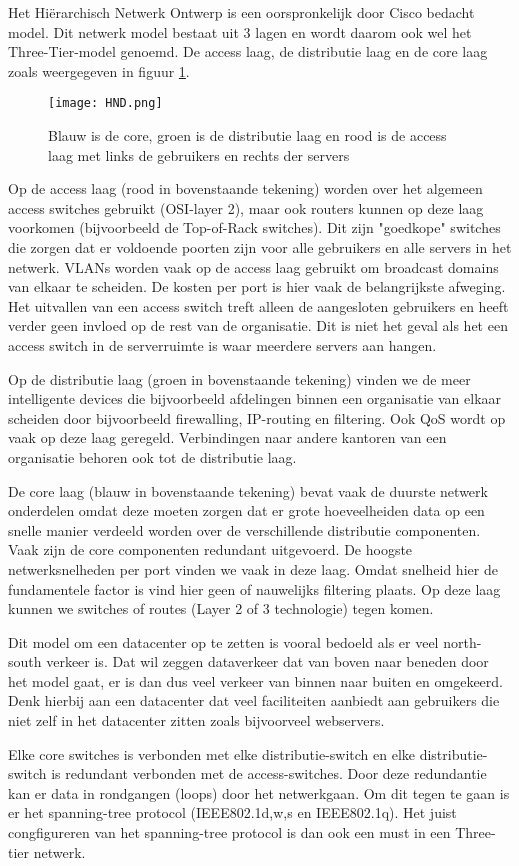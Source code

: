 Het Hi\"erarchisch Netwerk Ontwerp is een oorspronkelijk door Cisco bedacht model. Dit netwerk model bestaat uit 3 lagen en wordt daarom ook wel het Three-Tier-model genoemd. De access laag, de distributie laag en de core laag zoals weergegeven in figuur \ref{HND}.

\begin{figure}[H]
\centering
\texttt{[image: HND.png]}
\caption{Blauw is de core, groen is de distributie laag en rood is de access laag met links de gebruikers en rechts der servers}
\label{HND}
\end{figure}

Op de access laag (rood in bovenstaande tekening) worden over het algemeen access switches gebruikt (OSI-layer 2), maar ook routers kunnen op deze laag voorkomen (bijvoorbeeld de Top-of-Rack switches). Dit zijn "goedkope" switches die zorgen dat er voldoende poorten zijn voor alle gebruikers en alle servers in het netwerk. VLANs worden vaak op de access laag gebruikt om broadcast domains van elkaar te scheiden. De kosten per port is hier vaak de belangrijkste afweging. Het uitvallen van een access switch treft alleen de aangesloten gebruikers en heeft verder geen invloed op de rest van de organisatie. Dit is niet het geval als het een access switch in de serverruimte is waar meerdere servers aan hangen.

Op de distributie laag (groen in bovenstaande tekening) vinden we de meer intelligente devices die bijvoorbeeld afdelingen binnen een organisatie van elkaar scheiden door bijvoorbeeld firewalling, IP-routing en filtering. Ook QoS wordt op vaak op deze laag geregeld. Verbindingen naar andere kantoren van een organisatie behoren ook tot de distributie laag. 

De core laag (blauw in bovenstaande tekening) bevat vaak de duurste netwerk onderdelen omdat deze moeten zorgen dat er grote hoeveelheiden data op een snelle manier verdeeld worden over de verschillende distributie componenten. Vaak zijn de core componenten redundant uitgevoerd. De hoogste netwerksnelheden per port vinden we vaak in deze laag. Omdat snelheid hier de fundamentele factor is vind hier geen of nauwelijks filtering plaats. Op deze laag kunnen we switches of routes (Layer 2 of 3 technologie) tegen komen.

Dit model om een datacenter op te zetten is vooral bedoeld als er veel north-south verkeer is. Dat wil zeggen dataverkeer dat van boven naar beneden door het model gaat, er is dan dus veel verkeer van binnen naar buiten en omgekeerd. Denk hierbij aan een datacenter dat veel faciliteiten aanbiedt aan gebruikers die niet zelf in het datacenter zitten zoals bijvoorveel webservers.

Elke core switches is verbonden met elke distributie-switch en elke distributie-switch is redundant verbonden met de access-switches. Door deze redundantie kan er data in rondgangen (loops) door het netwerkgaan. Om dit tegen te gaan is er het spanning-tree protocol (IEEE802.1d,w,s en IEEE802.1q). Het juist congfigureren van het spanning-tree protocol is dan ook een must in een Three-tier netwerk.
